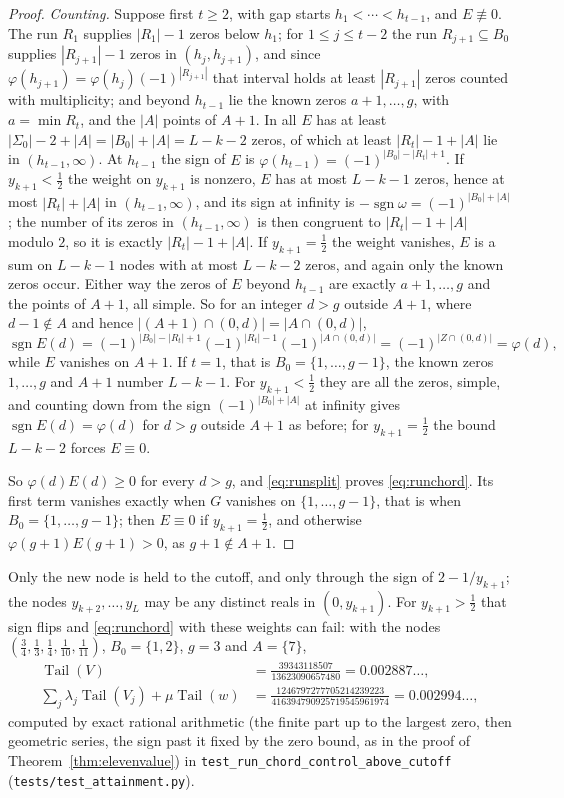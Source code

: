 \documentclass[11pt]{article}
\theoremstyle{definition}
\theoremstyle{plain}
\DeclareMathOperator{\Tail}{Tail}
\DeclareMathOperator{\sgn}{sgn}
\begin{document}
\begin{proof}
\emph{Counting.}  Suppose first $t\ge2$, with gap starts
$h_1<\cdots<h_{t-1}$, and $E\not\equiv0$.  The run $R_1$ supplies $|R_1|-1$
zeros below $h_1$; for $1\le j\le t-2$ the run $R_{j+1}\subseteq B_0$
supplies $|R_{j+1}|-1$ zeros in $(h_j,h_{j+1})$, and since
$\varphi(h_{j+1})=\varphi(h_j)(-1)^{|R_{j+1}|}$ that interval holds at least
$|R_{j+1}|$ zeros counted with multiplicity; and beyond $h_{t-1}$ lie the
known zeros $a+1,\ldots,g$, with $a=\min R_t$, and the $|A|$ points of $A+1$.
In all $E$ has at least $|\Sigma_0|-2+|A|=|B_0|+|A|=L-k-2$ zeros, of which at least
$|R_t|-1+|A|$ lie in $(h_{t-1},\infty)$.  At $h_{t-1}$ the sign of $E$ is
$\varphi(h_{t-1})=(-1)^{|B_0|-|R_t|+1}$.  If $y_{k+1}<\tfrac12$ the weight on
$y_{k+1}$ is nonzero, $E$ has at most $L-k-1$ zeros, hence at most
$|R_t|+|A|$ in $(h_{t-1},\infty)$, and its sign at infinity is
$-\sgn\omega=(-1)^{|B_0|+|A|}$; the number of its zeros in
$(h_{t-1},\infty)$ is then congruent to $|R_t|-1+|A|$ modulo $2$, so it is
exactly $|R_t|-1+|A|$.  If $y_{k+1}=\tfrac12$ the weight vanishes, $E$ is a
sum on $L-k-1$ nodes with at most $L-k-2$ zeros, and again only the known
zeros occur.  Either way the zeros of $E$ beyond $h_{t-1}$ are exactly
$a+1,\ldots,g$ and the points of $A+1$, all simple.  So for an integer $d>g$
outside $A+1$, where $d-1\notin A$ and hence $|(A+1)\cap(0,d)|=|A\cap(0,d)|$,
\[
  \sgn E(d)=(-1)^{|B_0|-|R_t|+1}(-1)^{|R_t|-1}(-1)^{|A\cap(0,d)|}
  =(-1)^{|Z\cap(0,d)|}=\varphi(d),
\]
while $E$ vanishes on $A+1$.  If $t=1$, that is $B_0=\{1,\ldots,g-1\}$, the
known zeros $1,\ldots,g$ and $A+1$ number $L-k-1$.  For $y_{k+1}<\tfrac12$
they are all the zeros, simple, and counting down from the sign
$(-1)^{|B_0|+|A|}$ at infinity gives $\sgn E(d)=\varphi(d)$ for $d>g$ outside
$A+1$ as before; for $y_{k+1}=\tfrac12$ the bound $L-k-2$ forces
$E\equiv0$.

So $\varphi(d)E(d)\ge0$ for every $d>g$, and \eqref{eq:runsplit} proves
\eqref{eq:runchord}.  Its first term vanishes exactly when $G$ vanishes on
$\{1,\ldots,g-1\}$, that is when $B_0=\{1,\ldots,g-1\}$; then $E\equiv0$ if
$y_{k+1}=\tfrac12$, and otherwise $\varphi(g+1)E(g+1)>0$, as $g+1\notin A+1$.
\end{proof}

Only the new node is held to the cutoff, and only through the sign of
$2-1/y_{k+1}$; the nodes $y_{k+2},\ldots,y_L$ may be any distinct reals in
$(0,y_{k+1})$.  For $y_{k+1}>\tfrac12$ that sign flips and
\eqref{eq:runchord} with these weights can fail: with the nodes
$(\tfrac34,\tfrac13,\tfrac14,\tfrac1{10},\tfrac1{11})$, $B_0=\{1,2\}$, $g=3$
and $A=\{7\}$,
\begin{align*}
  \Tail(V)&=\tfrac{39343118507}{13623090657480}=0.002887\ldots,\\
  \sum_j\lambda_j\Tail(V_j)+\mu\Tail(w)
  &=\tfrac{1246797277705214239223}{416394790925719545961974}=0.002994\ldots,
\end{align*}
computed by exact rational arithmetic (the finite part up to the largest
zero, then geometric series, the sign past it fixed by the zero bound, as in
the proof of Theorem~\ref{thm:elevenvalue}) in
\texttt{test\_run\_chord\_control\_above\_cutoff}
(\texttt{tests/test\_attainment.py}).
\end{document}

